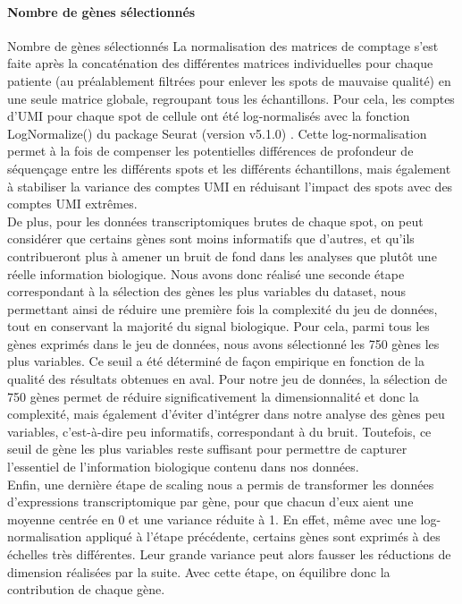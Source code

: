 \documentclass[11pt]{article}
\begin{document}
\paragraph{Nombre de gènes sélectionnés}

Nombre de gènes sélectionnés La normalisation des matrices de comptage s’est faite après la concaténation des différentes matrices individuelles pour chaque patiente (au préalablement filtrées pour enlever les spots de mauvaise qualité) en une seule matrice globale, regroupant tous les échantillons. Pour cela, les comptes d’UMI pour chaque spot de cellule ont été log-normalisés avec la fonction LogNormalize() du package Seurat (version v5.1.0) \cite{Seurat510}. Cette log-normalisation permet à la fois de compenser les potentielles différences de profondeur de séquençage entre les différents spots et les différents échantillons, mais également à stabiliser la variance des comptes UMI en réduisant l’impact des spots avec des comptes UMI extrêmes.\\

De plus, pour les données transcriptomiques brutes de chaque spot, on peut considérer que certains gènes sont moins informatifs que d’autres, et qu’ils contribueront plus à amener un bruit de fond dans les analyses que plutôt une réelle information biologique. Nous avons donc réalisé une seconde étape correspondant à la sélection des gènes les plus variables du dataset, nous permettant ainsi de réduire une première fois la complexité du jeu de données, tout en conservant la majorité du signal biologique. Pour cela, parmi tous les gènes exprimés dans le jeu de données, nous avons sélectionné les 750 gènes les plus variables. Ce seuil a été déterminé de façon empirique en fonction de la qualité des résultats obtenues en aval. Pour notre jeu de données, la sélection de 750 gènes permet de réduire significativement la dimensionnalité et donc la complexité, mais également d’éviter d’intégrer dans notre analyse des gènes peu variables, c’est-à-dire peu informatifs, correspondant à du bruit. Toutefois, ce seuil de gène les plus variables reste suffisant pour permettre de capturer l’essentiel de l’information biologique contenu dans nos données.\\

Enfin, une dernière étape de scaling nous a permis de transformer les données d’expressions transcriptomique par gène, pour que chacun d’eux aient une moyenne centrée en 0 et une variance réduite à 1. En effet, même avec une log-normalisation appliqué à l’étape précédente, certains gènes sont exprimés à des échelles très différentes. Leur grande variance peut alors fausser les réductions de dimension réalisées par la suite. Avec cette étape, on équilibre donc la contribution de chaque gène.
\end{document}
